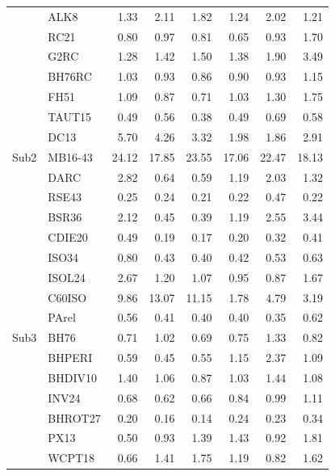 \begin{ThreePartTable}
\begin{longtable}{lld{2.2}d{2.2}d{2.2}d{2.2}d{2.2}d{2.2}}
          & ALK8      & 1.33  & 2.11  & 1.82  & 1.24   & 2.02  & 1.21  \\
          & RC21      & 0.80  & 0.97  & 0.81  & 0.65   & 0.93  & 1.70  \\
          & G2RC      & 1.28  & 1.42  & 1.50  & 1.38   & 1.90  & 3.49  \\
          & BH76RC    & 1.03  & 0.93  & 0.86  & 0.90   & 0.93  & 1.15  \\
          & FH51      & 1.09  & 0.87  & 0.71  & 1.03   & 1.30  & 1.75  \\
          & TAUT15    & 0.49  & 0.56  & 0.38  & 0.49   & 0.69  & 0.58  \\
          & DC13      & 5.70  & 4.26  & 3.32  & 1.98   & 1.86  & 2.91  \\ \midrule
  Sub2    & MB16-43   & 24.12 & 17.85 & 23.55 & 17.06  & 22.47 & 18.13 \\
          & DARC      & 2.82  & 0.64  & 0.59  & 1.19   & 2.03  & 1.32  \\
          & RSE43     & 0.25  & 0.24  & 0.21  & 0.22   & 0.47  & 0.22  \\
          & BSR36     & 2.12  & 0.45  & 0.39  & 1.19   & 2.55  & 3.44  \\
          & CDIE20    & 0.49  & 0.19  & 0.17  & 0.20   & 0.32  & 0.41  \\
          & ISO34     & 0.80  & 0.43  & 0.40  & 0.42   & 0.53  & 0.63  \\
          & ISOL24    & 2.67  & 1.20  & 1.07  & 0.95   & 0.87  & 1.67  \\
          & C60ISO    & 9.86  & 13.07 & 11.15 & 1.78   & 4.79  & 3.19  \\
          & PArel     & 0.56  & 0.41  & 0.40  & 0.40   & 0.35  & 0.62  \\ \midrule
  Sub3    & BH76      & 0.71  & 1.02  & 0.69  & 0.75   & 1.33  & 0.82  \\
          & BHPERI    & 0.59  & 0.45  & 0.55  & 1.15   & 2.37  & 1.09  \\
          & BHDIV10   & 1.40  & 1.06  & 0.87  & 1.03   & 1.44  & 1.08  \\
          & INV24     & 0.68  & 0.62  & 0.66  & 0.84   & 0.99  & 1.11  \\
          & BHROT27   & 0.20  & 0.16  & 0.14  & 0.24   & 0.23  & 0.34  \\
          & PX13      & 0.50  & 0.93  & 1.39  & 1.43   & 0.92  & 1.81  \\
          & WCPT18    & 0.66  & 1.41  & 1.75  & 1.19   & 0.82  & 1.62  \\ \midrule

\end{longtable}
\end{ThreePartTable}
